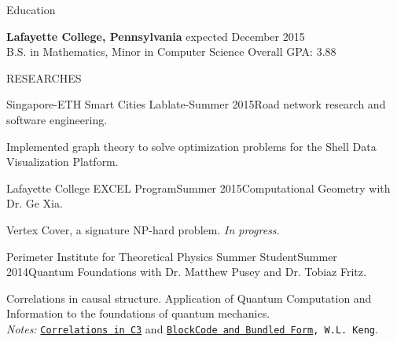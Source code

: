 \documentclass{resume} %
\begin{document}
\begin{rSection}{Education}

{\bf Lafayette College, Pennsylvania} \hfill expected December 2015\\ 
B.S. in Mathematics, Minor in Computer Science \hfill Overall GPA: 3.88
\end{rSection}


\begin{rSection}{RESEARCHES}

\begin{rSubsection}{Singapore-ETH Smart Cities Lab}{late-Summer 2015}{Road network research and software engineering.}{}
\item Implemented graph theory to solve optimization problems for the Shell Data Visualization Platform.

\end{rSubsection}

\begin{rSubsection}{Lafayette College EXCEL Program}{Summer 2015}{Computational Geometry with Dr. Ge Xia.}{}
\item Vertex Cover, a signature NP-hard problem. {\em In progress.}
\end{rSubsection}



\begin{rSubsection}{Perimeter Institute for Theoretical Physics Summer Student}{Summer 2014}{Quantum Foundations with Dr. Matthew Pusey and Dr. Tobiaz Fritz.}{}
\item Correlations in causal structure. Application of Quantum Computation and Information to the foundations of quantum mechanics. \\
{\em Notes:} {\tt \href{https://github.com/kengz/Quantum-Foundations-Correlations/blob/master/Keng%20Correlations%20in%20C3.pdf}{\textcolor{Cerulean}{Correlations in C3}}} and {\tt \href{https://github.com/kengz/Quantum-Foundations-Correlations/blob/master/Keng%20blockcode.pdf}{\textcolor{Cerulean}{BlockCode and Bundled Form}}, W.L. Keng}.
\end{rSubsection}


\end{rSection}
\end{document}
